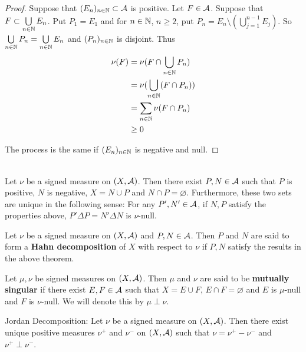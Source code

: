 \documentclass{book}
\begin{document}
	\begin{proof}
		Suppose that $(E_n)_{n \in \mathbb{N}} \subset \mathcal{A}$ is positive. Let $F \in \mathcal{A}$. Suppose that $F \subset \bigcup\limits_{n \in \mathbb{N}} E_n$. Put $P_1 = E_1$ and for $n \in \mathbb{N}$, $n \geq 2$, put $P_n = E_n \setminus (\bigcup\limits_{j=1}^{n-1} E_j)$. So $\bigcup\limits_{n \in \mathbb{N}} P_n = \bigcup\limits_{n \in \mathbb{N}} E_n$ and $(P_n)_{n \in \mathbb{N}}$ is disjoint. Thus 
		\begin{align*}
			\nu(F) 
			&= \nu(F \cap \bigcup_{n \in \mathbb{N}} P_n)\\
			&= \nu(\bigcup_{n \in \mathbb{N}} (F \cap P_n))\\
			&= \sum\limits_{n \in \mathbb{N}} \nu(F \cap P_n)\\
			& \geq 0 
		\end{align*}
		
		The process is the same if $(E_n)_{n \in \mathbb{N}}$ is negative and null.
	\end{proof}
	
	\begin{thm}  \\
		Let $\nu$ be a signed measure on $(X, \mathcal{A})$. Then there exist $P,N \in \mathcal{A}$ such that $P$ is positive, $N$ is negative, $X = N \cup P$ and $N \cap P = \varnothing$. Furthermore, these two sets are unique in the following sense: For any $P',N' \in \mathcal{A}$, if $N,P$ satisfy the properties above, $P' \Delta P = N' \Delta N$ is $\nu$-null.
	\end{thm}
	
	\begin{defn}  
		Let $\nu$ be a signed measure on $(X, \mathcal{A})$ and $P,N \in \mathcal{A}$. Then $P$ and $N$ are said to form a \textbf{Hahn decomposition} of $X$ with respect to $\nu$ if $P,N$ satisfy the results in the above theorem.
	\end{defn}
	
	\begin{defn}  
		Let $\mu, \nu$ be signed measures on $(X, \mathcal{A})$. Then $\mu$ and $\nu$ are said to be \textbf{mutually singular} if there exist $E, F \in \mathcal{A}$ such that $X = E \cup F$, $E \cap F = \varnothing$ and $E$ is $\mu$-null and $F$ is $\nu$-null. We will denote this by $\mu \perp \nu$.
	\end{defn}
	
	\begin{ex}{Jordan Decomposition:}
		Let $\nu$ be a signed measure on $(X, \mathcal{A})$. Then there exist unique positive measures $\nu^+$ and $\nu^-$ on $(X, \mathcal{A})$ such that $\nu = \nu^+ - \nu^-$ and $\nu^+ \perp \nu^-$. 
	\end{ex}
	
\end{document}
